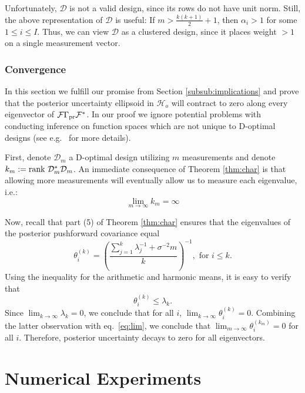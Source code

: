 \documentclass[ba]{imsart}
\newcommand{\hilo}{\mathcal{H}_o}
\newcommand{\fwd}{\mathcal{F}}
\newcommand{\rank}{\textup{rank}\ }
\newcommand{\opt}{\mathcal{D}}
\theoremstyle{plain}
\theoremstyle{definition}
\theoremstyle{remark}
\begin{document}
Unfortunately, $\opt$ is not a valid design, since its rows do not
have unit norm. Still, the above representation of $\opt$ is useful:
If $m > \frac{k(k+1)}{2} + 1$, then $\alpha_i > 1$ for some $1\leq i
\leq I$.  Thus, we can view $\opt$ as a clustered design, since it
places weight $>1$ on a single measurement vector.


\subsubsection{Convergence}\label{subsub:convergence}
In this section we fulfill our promise from Section
\ref{subsub:implications} and prove that the posterior uncertainty
ellipsoid in $\hilo$ will contract to zero along every eigenvector of
$\fwd \prcov \fwd^*$. In our proof we ignore potential problems with
conducting inference on function spaces which are not unique to
D-optimal designs (see e.g.~\cite{owhadi2015} for more details).


First, denote $\opt_m$ a D-optimal design utilizing $m$ measurements
and denote $k_m := \rank\opt_m^*\opt_m$. An immediate consequence of
Theorem \ref{thm:char} is that allowing more measurements will
eventually allow us to measure each eigenvalue, i.e.:
\begin{equation}\label{eq:lim}
  \lim_{m\to\infty} k_m = \infty
\end{equation}

Now, recall that part (5) of Theorem \ref{thm:char} ensures that the
eigenvalues of the posterior pushforward covariance equal
\begin{equation*}
  \theta^{(k)}_i = \left ( \frac{\sum_{j=1}^{k} \lambda_j^{-1} +
    \sigma^{-2}m}{k} \right )^{-1}, \text{ for $i\leq k$}.
\end{equation*}
Using the inequality for the arithmetic and harmonic means, it is easy
to verify that
\begin{equation*}
  \theta^{(k)}_i \leq \lambda_{k}.
\end{equation*}
Since $\lim_{k\to \infty} \lambda_k= 0$, we conclude that for all $i$,
$\lim_{k\to\infty} \theta^{(k)}_i = 0$. Combining the latter
observation with eq.~\eqref{eq:lim}, we conclude that
$\lim_{m\to\infty} \theta^{(k_m)}_i = 0$ for all $i$. Therefore,
posterior uncertainty decays to zero for all eigenvectors.
 \section{Numerical Experiments}
\end{document}
